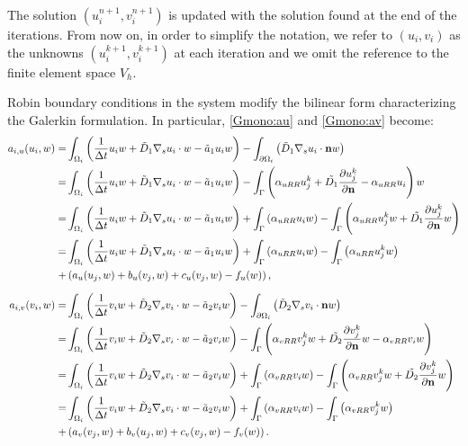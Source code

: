 The solution $(u_i^{n+1}, v_i^{n+1})$ is updated with the solution found at the end of the iterations. From now on, in order to simplify the notation, we refer to $(u_i, v_i)$ as the unknowns $(u_i^{k+1}, v_i^{k+1})$ at each iteration and we omit the reference to the finite element space $V_h$.

Robin boundary conditions in the system modify the bilinear form characterizing the Galerkin formulation. In particular, \eqref{Gmono:au} and \eqref{Gmono:av} become:
\begin{equation*}\begin{aligned}
    a_{i,u}(u_i, w) = & \int_{\Omega_i} \left( \frac{1}{\Delta t} u_i w + \Tilde{D}_1 \nabla_s u_i \cdot w - \Tilde{a}_1 u_i w \right) - \int_{\partial \Omega_i} \left(\Tilde{D}_1 \nabla_s u_i \cdot \mathbf{n} w \right) \\
    = & \int_{\Omega_i} \left( \frac{1}{\Delta t} u_i w + \Tilde{D}_1 \nabla_s u_i \cdot w - \Tilde{a}_1 u_i w \right) - \int_{\Gamma} \left(\alpha_{uRR} u_j^{k} +\Tilde{D_1} \frac{\partial u_j^{k}}{\partial \mathbf{n}} - \alpha_{uRR} u_i \right) w
    \\
    = & \int_{\Omega_i} \left( \frac{1}{\Delta t} u_i w + \Tilde{D}_1 \nabla_s u_i \cdot w - \Tilde{a}_1 u_i w\right) + \int_{\Gamma} \left(\alpha_{uRR} u_i w \right)  - \int_{\Gamma} \left( \alpha_{uRR} u_j^k w + \Tilde{D_1} \frac{\partial u_j^{k}}{\partial \mathbf{n}} w \right) \\
    = & \int_{\Omega_i} \left( \frac{1}{\Delta t} u_i w + \Tilde{D}_1 \nabla_s u_i \cdot w - \Tilde{a}_1 u_i w\right) + \int_{\Gamma} \left(\alpha_{uRR} u_i w \right)  - \int_{\Gamma} \left( \alpha_{uRR} u_j^k w \right) \\
    + & \left( a_u(u_j, w) + b_u(v_j,w) + c_u(v_j, w)- f_u(w) \right),
\\[6pt]
    a_{i,v}(v_i, w) = & \int_{\Omega_i} \left( \frac{1}{\Delta t} v_i w + \Tilde{D}_2 \nabla_s v_i \cdot w - \Tilde{a}_2 v_i w \right) - \int_{\partial \Omega_i} \left(\Tilde{D}_2 \nabla_s v_i \cdot \mathbf{n} w \right) \\
    = & \int_{\Omega_i} \left( \frac{1}{\Delta t} v_i w + \Tilde{D}_2 \nabla_s v_i \cdot w - \Tilde{a}_2 v_i w \right) - \int_{\Gamma} \left(\alpha_{vRR} v_j^{k} w +\Tilde{D_2} \frac{\partial v_j^{k}}{\partial \mathbf{n}} w - \alpha_{vRR} v_i w \right)
    \\
    = & \int_{\Omega_i} \left( \frac{1}{\Delta t} v_i w + \Tilde{D}_2 \nabla_s v_i \cdot w - \Tilde{a}_2 v_i w\right) + \int_{\Gamma} \left(\alpha_{vRR} v_i w \right)  - \int_{\Gamma} \left( \alpha_{vRR} v_j^k w + \Tilde{D_2} \frac{\partial v_j^{k}}{\partial \mathbf{n}} w \right) \\
    = & \int_{\Omega_i} \left( \frac{1}{\Delta t} v_i w + \Tilde{D}_2 \nabla_s v_i \cdot w - \Tilde{a}_2 v_i w\right) + \int_{\Gamma} \left(\alpha_{vRR} v_i w \right)  - \int_{\Gamma} \left( \alpha_{vRR} v_j^k w \right) \\
    + & \left( a_v(v_j, w) + b_v(u_j,w) + c_v(v_j, w)- f_v( w) \right).
\end{aligned}\end{equation*}
